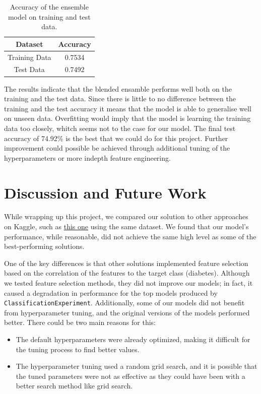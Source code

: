 \documentclass[a4paper,12pt]{article}
\begin{document}
\begin{table}[h]
    \centering
    \begin{tabular}{|c|c|}
        \hline
        \textbf{Dataset} & \textbf{Accuracy} \\
        \hline
        Training Data & 0.7534 \\
        Test Data & 0.7492 \\
        \hline
    \end{tabular}
    \caption{Accuracy of the ensemble model on training and test data.}
    \label{tab:accuracy_results}
\end{table}

The results indicate that the blended ensamble performs well both on the training and the test data. Since there is little to 
no difference between the training and the test accuracy it means that the model is able to generalise well on unseen data. 
Overfitting would imply that the model is learning the training data too closely, whitch seems not to the case for our model.
The final test accuracy of 74.92\% is the best that we could do for this project. 
Further improvement could possible be achieved through additional tuning of the hyperparameters or more indepth feature engineering.


\section{Discussion and Future Work}

While wrapping up this project, we compared our solution to other approaches on Kaggle, such as \href{https://www.kaggle.com/code/solafajobi/diabetes-perfect-prediction}{this one} using the same dataset. 
We found that our model's performance, while reasonable, did not achieve the same high level as some of the best-performing solutions.

One of the key differences is that other solutions implemented feature selection based on the correlation of the features to the target class (diabetes). 
Although we tested feature selection methods, they did not improve our models; in fact, it caused a degradation in performance for the top models produced by \texttt{ClassificationExperiment}. 
Additionally, some of our models did not benefit from hyperparameter tuning, and the original versions of the models performed better. 
There could be two main reasons for this:
\begin{itemize}
    \item The default hyperparameters were already optimized, making it difficult for the tuning process to find better values.
    \item The hyperparameter tuning used a random grid search, and it is possible that the tuned parameters were not as effective as they could have been with a better search method like grid search.
\end{itemize}
\end{document}
